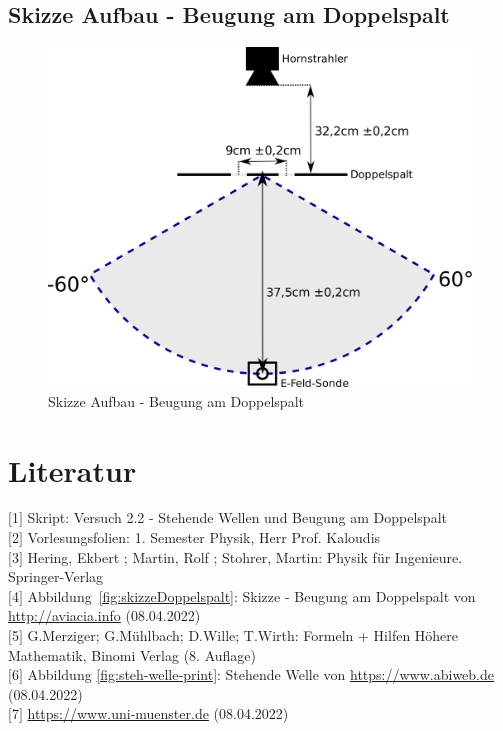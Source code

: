 \documentclass[a4paper]{scrartcl}
\numberwithin{equation}{subsection}
\begin{document}
\subsection{Skizze Aufbau - Beugung am Doppelspalt}

\label{sec:SkizzeDoppelspalt}

\begin{figure}[H]
\includegraphics[width=12cm]{Zeichnung_Doppelspalt}
\centering
\caption{Skizze Aufbau - Beugung am Doppelspalt}
\centering
\label{fig:SkizzeDoppelspalt}
\end{figure}

\newpage
\section{Literatur}
$[$1$]$ Skript: Versuch 2.2 - Stehende Wellen und Beugung am Doppelspalt \\
$[$2$]$ Vorlesungsfolien: 1. Semester Physik, Herr Prof. Kaloudis \\
$[$3$]$ Hering, Ekbert ; Martin, Rolf ; Stohrer, Martin: Physik für Ingenieure. Springer-Verlag \\
$[$4$]$ Abbildung~\ref{fig:skizzeDoppelspalt}: Skizze - Beugung am Doppelspalt von \href{http://aviacia.info/p/beugung-am-gitter-4265}{http://aviacia.info} (08.04.2022)\\
$[$5$]$ G.Merziger; G.Mühlbach; D.Wille; T.Wirth: Formeln + Hilfen Höhere Mathematik, Binomi Verlag (8. Auflage)\\
$[$6$]$ Abbildung \ref{fig:steh-welle-print}: Stehende Welle von \href{https://www.abiweb.de/assets/courses/media/steh-welle-print.png}{https://www.abiweb.de} (08.04.2022)\\
$[$7$]$ \href{https://www.uni-muenster.de/imperia/md/content/fachbereich_physik/didaktik_physik/materialien/materialaltmeyer/schwingungen_wellen.pdf}{https://www.uni-muenster.de} (08.04.2022)\\


\label{LastPage}
\end{document}
